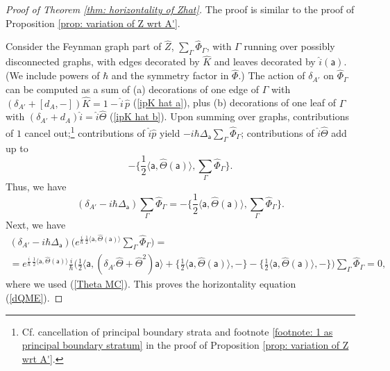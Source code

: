 \documentclass[11pt,a4paper]{amsart}
\theoremstyle{plain} %
\theoremstyle{definition}
\theoremstyle{remark}
\newcommand{\sfa}{\mathsf{a}}
\newcommand{\wh}{\widehat}
\begin{document}
{%
\begin{proof}[Proof of Theorem \ref{thm: horizontality of Zhat}]
The proof is similar to the proof of Proposition \ref{prop: variation of Z wrt A'}.

Consider the Feynman graph part of $\wh{Z}$, $\sum_\Gamma \wh{\Phi}_\Gamma$, with $\Gamma$ running over possibly disconnected graphs, with edges decorated by $\wh{K}$ and leaves decorated by $\wh{i}(\sfa)$. (We include powers of $\hbar$ and the symmetry factor in $\wh\Phi$.)  The action of $\delta_{A'}$ on $\wh\Phi_\Gamma$ can be computed as a sum of (a) decorations of one edge of $\Gamma$ with $(\delta_{A'}+[d_A,-])\wh{K}=1-\wh{i}\,\wh{p}$  (\ref{ipK hat a}), plus  (b) decorations of one leaf of $\Gamma$ with $(\delta_{A'}+d_A)\wh{i}=\wh{i}\wh\Theta$ (\ref{ipK hat b}).
Upon summing over graphs, contributions of $1$ cancel out;\footnote{Cf. cancellation of principal boundary strata and footnote \ref{footnote: 1 as principal boundary stratum} in the proof of Proposition \ref{prop: variation of Z wrt A'}. } contributions of 
$\wh{i}\wh{p}$ yield $-i\hbar\Delta_\sfa \sum_\Gamma \wh\Phi_\Gamma$; contributions of $\wh{i}\wh\Theta$ add up to 
$$-\Big\{\frac12 \langle \sfa,\wh\Theta(\sfa) \rangle,\sum_\Gamma \wh\Phi_\Gamma\Big\}.$$
Thus, we have
$$ (\delta_{A'}-i\hbar \Delta_\sfa
 ) \sum_\Gamma \wh\Phi_\Gamma =-\Big\{\frac12 \langle \sfa,\wh\Theta(\sfa) \rangle,\sum_\Gamma \wh\Phi_\Gamma\Big\}. $$
Next, we have
\begin{multline*}
(\delta_{A'}-i\hbar\Delta_\sfa)\Big(e^{\frac{i}{\hbar}\,\frac12\langle \sfa,\wh\Theta(\sfa) \rangle} \sum_\Gamma \wh\Phi_\Gamma\Big)=\\
=e^{\frac{i}{\hbar}\,\frac12\langle \sfa,\wh\Theta(\sfa) \rangle}\frac{i}{\hbar}\Big(\frac12\langle \sfa,(\delta_{A'}\wh\Theta+\wh\Theta^2)\sfa\rangle+
\Big\{\frac12\langle \sfa,\wh\Theta(\sfa) \rangle,-\Big\}-\Big\{\frac12\langle \sfa,\wh\Theta(\sfa) \rangle,-\Big\}
\Big) \sum_\Gamma \wh\Phi_\Gamma =0,
\end{multline*}
where we used (\ref{Theta MC}).
This proves the horizontality equation (\ref{dQME}).
\end{proof}

}
\end{document}
